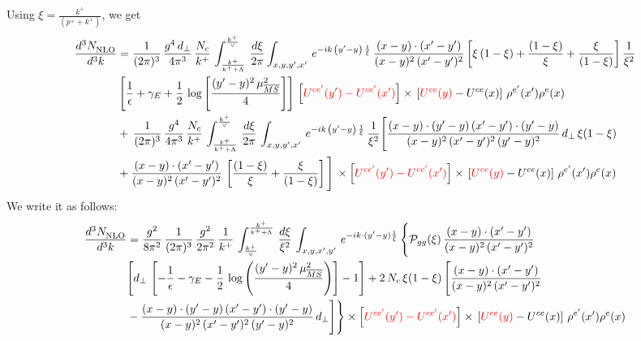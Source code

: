\documentclass[9pt]{article}
\numberwithin{equation}{section}
\begin{document}
Using $\xi = \frac{k^{+}}{(p^{+}+k^{+})}$, we get
\begin{align}
     \frac{d^{3}N_{\rm NLO}^{\rm}}{d^{3}k}  & =  \frac{1}{(2\pi)^{3}}\,\frac{g^{4}\,d_{\perp}}{4\pi^{3}}\,\frac{N_{c}}{k^{+}}\,\int_{\frac{k^{+}}{k^{+}+\Lambda}}^{\frac{k^{+}}{\vee}}\, \frac{d\xi}{2\pi}\int_{x,y,y^{\prime},x'}\,e^{-ik\,\left(y'-y\right)\,\frac{1}{\xi}}\,\frac{(x-y)\cdot (x'-y')}{(x-y)^{2}\,(x'-y')^{2}}\,\bigg[\xi\,(1-\xi)+\frac{(1-\xi)}{\xi}+\frac{\xi}{(1-\xi)}\bigg]\,\frac{1}{\xi^{2}}\notag \\ & \left[\frac{1}{\epsilon} +\gamma_{E} +\frac{1}{2}\,\log{\left[\frac{(y'-y)^{2}\,\mu^{2}_{\overline{MS}}}{4}\right]}\right]\,\left[{\color{red}U^{ce'}(y') - U^{ce'}(x')}\right] \times\, \left[{\color{red}U^{ce}(y)} - U^{ce}(x)\right]\, \rho^{e'}(x') \rho^{e}(x)\notag \\ & +\,\frac{1}{(2\pi)^{3}}\,\frac{g^{4}}{4\pi^{3}}\,\frac{N_{c}}{k^{+}}\,\int_{\frac{k^{+}}{k^{+}+\Lambda}}^{\frac{k^{+}}{\vee}}\, \frac{d\xi}{2\pi}\,\int_{x,y,y^{\prime},x'}\,e^{-ik\,\left(y'-y\right)\,\frac{1}{\xi}}\,\frac{1}{\xi^{2}}\Bigg[\frac{(x-y)\cdot (y'-y)\, (x'-y')\cdot (y'-y)}{(x-y)^{2}\,(x'-y')^{2}\,(y'-y)^{2}}\,d_{\perp}\,\xi(1-\xi)\notag \\ & + \frac{(x-y)\cdot (x'-y')}{(x-y)^{2}\,(x'-y')^{2}}\,\left[\frac{(1-\xi)}{\xi}+\frac{\xi}{(1-\xi)}\right]\Bigg]\,\times \left[{\color{red}U^{ce'}(y') - U^{ce'}(x')}\right] \times\, \left[{\color{red}U^{ce}(y)} - U^{ce}(x)\right]\, \rho^{e'}(x') \rho^{e}(x)
\end{align}
We write it as follows:
\begin{align}
    \frac{d^{3}N_{\rm NLO}^{\rm}}{d^{3}k}  & = \frac{g^{2}}{8\pi^{2}}\, \frac{1}{(2\pi)^{3}}\,\frac{g^{2}}{2\pi^{2}}\, \frac{1}{k^{+}}\,\int_{\frac{k^{+}}{\vee}}^{\frac{k^{+}}{k^{+}+\Lambda}}\, \frac{d\xi}{\xi^{2}}\, \int_{x,y,x',y'}\,e^{-ik\cdot (y'-y)\frac{1}{\xi}}\,\Bigg\{\mathcal{P}_{gg}(\xi)\,\frac{(x-y)\cdot (x'-y')}{(x-y)^{2}\,(x'-y')^{2}}\notag \\ & \Bigg[d_{\perp}\,\left[-\frac{1}{\epsilon}-\gamma_{E}-\frac{1}{2}\,\log{\left(\frac{(y'-y)^{2}\,\mu^{2}_{\overline{MS}}}{4}\right)}\right]-1\Bigg]+2\,N_{c}\,\xi(1-\xi)\,\Bigg[\frac{(x-y)\cdot (x'-y')}{(x-y)^{2}\, (x'-y')^{2}}\notag \\ & -\frac{(x-y)\cdot (y'-y)\, (x'-y')\cdot (y'-y)}{(x-y)^{2}\,(x'-y')^{2}\,(y'-y)^{2}}\,d_{\perp}\Bigg] \Bigg\}\times \left[{\color{red}U^{ce'}(y') - U^{ce'}(x')}\right] \times\, \left[{\color{red}U^{ce}(y)} - U^{ce}(x)\right]\, \rho^{e'}(x') \rho^{e}(x)
\end{align}
\end{document}
